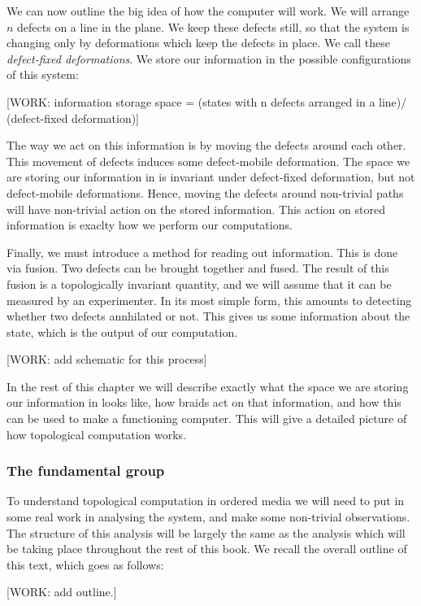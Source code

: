 \documentclass{article}
\theoremstyle{definition}
\newcommand{\0}{\left|0\right>}
\newcommand{\1}{\left|1\right>}
\numberwithin{figure}{section}
\begin{document}
We can now outline the big idea of how the computer will work. We will arrange $n$ defects on a line in the plane. We keep these defects still, so that the system is changing only by deformations which keep the defects in place. We call these \textit{defect-fixed deformations}. We store our information in the possible configurations of this system:

[WORK: information storage space = (states with n defects arranged in a line)/ (defect-fixed deformation)]

The way we act on this information is by moving the defects around each other. This movement of defects induces some defect-mobile deformation. The space we are storing our information in is invariant under defect-fixed deformation, but not defect-mobile deformations. Hence, moving the defects around non-trivial paths will have non-trivial action on the stored information. This action on stored information is exaclty how we perform our computations.

Finally, we must introduce a method for reading out information. This is done via fusion. Two defects can be brought together and fused. The result of this fusion is a topologically invariant quantity, and we will assume that it can be measured by an experimenter. In its most simple form, this amounts to detecting whether two defects annhilated or not.  This gives us some information about the state, which is the output of our computation.

[WORK: add schematic for this process]

In the rest of this chapter we will describe exactly what the space we are storing our information in looks like, how braids act on that information, and how this can be used to make a functioning computer. This will give a detailed picture of how topological computation works.

\subsubsection{The fundamental group}

To understand topological computation in ordered media we will need to put in some real work in analysing the system, and make some non-trivial observations. The structure of this analysis will be largely the same as the analysis which will be taking place throughout the rest of this book. We recall the overall outline of this text, which goes as follows:

[WORK: add outline.]
\end{document}
